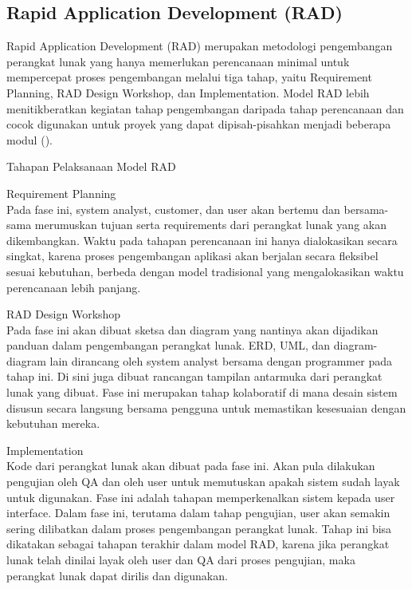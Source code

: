 \subsection{Rapid Application Development (RAD)}
Rapid Application Development (RAD) merupakan metodologi pengembangan perangkat 
lunak yang hanya memerlukan perencanaan minimal untuk mempercepat proses 
pengembangan melalui tiga tahap, yaitu Requirement Planning, RAD Design Workshop, 
dan Implementation. Model RAD lebih menitikberatkan kegiatan tahap pengembangan 
daripada tahap perencanaan dan cocok digunakan untuk proyek yang dapat 
dipisah-pisahkan menjadi beberapa modul (\cite{Parlika2023}).

Tahapan Pelaksanaan Model RAD
\begin{daftarnomor}
    \item Requirement Planning \\
          Pada fase ini, system analyst, customer, dan user akan bertemu dan bersama-sama merumuskan tujuan serta requirements 
          dari perangkat lunak yang akan dikembangkan. Waktu pada tahapan perencanaan ini hanya dialokasikan secara singkat, 
          karena proses pengembangan aplikasi akan berjalan secara fleksibel sesuai kebutuhan, berbeda dengan model tradisional 
          yang mengalokasikan waktu perencanaan lebih panjang.
    \item RAD Design Workshop \\
          Pada fase ini akan dibuat sketsa dan diagram yang nantinya akan dijadikan panduan dalam pengembangan perangkat lunak. 
          ERD, UML, dan diagram-diagram lain dirancang oleh system analyst bersama dengan programmer pada tahap ini. Di sini juga 
          dibuat rancangan tampilan antarmuka dari perangkat lunak yang dibuat. Fase ini merupakan tahap kolaboratif di mana 
          desain sistem disusun secara langsung bersama pengguna untuk memastikan kesesuaian dengan kebutuhan mereka.
    \item Implementation \\
          Kode dari perangkat lunak akan dibuat pada fase ini. Akan pula dilakukan pengujian oleh QA dan oleh user untuk 
          memutuskan apakah sistem sudah layak untuk digunakan. Fase ini adalah tahapan memperkenalkan sistem kepada user interface. 
          Dalam fase ini, terutama dalam tahap pengujian, user akan semakin sering dilibatkan dalam proses pengembangan perangkat lunak. 
          Tahap ini bisa dikatakan sebagai tahapan terakhir dalam model RAD, karena jika perangkat lunak telah dinilai layak oleh 
          user dan QA dari proses pengujian, maka perangkat lunak dapat dirilis dan digunakan.
\end{daftarnomor}

